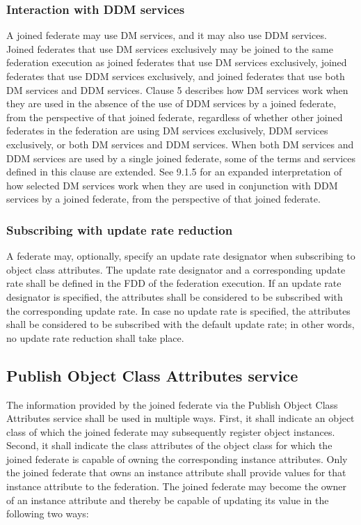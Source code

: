 \begin{compactstdpage}
    \subsubsection{Interaction with DDM services}

    A joined federate may use DM services, and it may also use DDM services. Joined federates that use DM services exclusively may be joined to the same federation execution as joined federates that use DM services exclusively, joined federates that use DDM services exclusively, and joined federates that use both DM services and DDM services. Clause 5 describes how DM services work when they are used in the absence of the use of DDM services by a joined federate, from the perspective of that joined federate, regardless of whether other joined federates in the federation are using DM services exclusively, DDM services exclusively, or both DM services and DDM services. When both DM services and DDM services are used by a single joined federate, some of the terms and services defined in this clause are extended. See 9.1.5 for an expanded interpretation of how selected DM services work when they are used in conjunction with DDM services by a joined federate, from the perspective of that joined federate.

    \subsubsection{Subscribing with update rate reduction}

    A federate may, optionally, specify an update rate designator when subscribing to object class attributes. The update rate designator and a corresponding update rate shall be defined in the FDD of the federation execution. If an update rate designator is specified, the attributes shall be considered to be subscribed with the corresponding update rate. In case no update rate is specified, the attributes shall be considered to be subscribed with the default update rate; in other words, no update rate reduction shall take place.

    \subsection{Publish Object Class Attributes service}

    The information provided by the joined federate via the Publish Object Class Attributes service shall be used in multiple ways. First, it shall indicate an object class of which the joined federate may subsequently register object instances. Second, it shall indicate the class attributes of the object class for which the joined federate is capable of owning the corresponding instance attributes. Only the joined federate that owns an instance attribute shall provide values for that instance attribute to the federation. The joined federate may become the owner of an instance attribute and thereby be capable of updating its value in the following two ways:


\end{compactstdpage}
